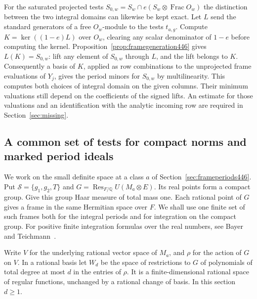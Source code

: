 \documentclass[a4paper,11pt]{article}
\theoremstyle{definition}
\theoremstyle{remark}
\numberwithin{equation}{section}
\begin{document}
For the saturated projected tests \(S_{0,w}=S_w\cap e(S_w\otimes
\operatorname{Frac}O_w)\) the distinction between the two integral
domains can likewise be kept exact. Let \(L\) send the standard
generators of a free \(O_w\)-module to the tests \(t_{a,g}\).
Compute \(K=\ker((1-e)L)\) over \(O_w\), clearing any scalar
denominator of \(1-e\) before computing the kernel.
Proposition~\ref{prop:framegeneration446} gives \(L(K)=S_{0,w}\):
lift any element of \(S_{0,w}\) through \(L\), and the lift
belongs to \(K\). Consequently a basis of \(K\), applied as row
combinations to the unprojected frame evaluations of \(Y_j\),
gives the period minors for \(S_{0,w}\) by multilinearity.
This computes both choices of integral domain on the given columns.
Their minimum valuations still depend on the coefficients of the
signed lifts. An estimate for those valuations and an identification
with the analytic incoming row are required in Section~\ref{sec:missing}.


\subsection{A common set of tests for compact norms and marked period ideals}
\label{sec:compactquadrature447}

We work on the small definite space at a class \(a\) of
Section~\ref{sec:frameperiods446}. Put \(\mathcal S=\{g_1,g_2,T\}\)
and \(G=\operatorname{Res}_{F/\mathbb Q}U(M_a\otimes E)\). Its real
points form a compact group. Give this group Haar measure of total
mass one. Each rational point of \(G\) gives a frame in the same
Hermitian space over \(F\). We shall use one finite set of such
frames both for the integral periods and for integration on the
compact group. For positive finite integration formulas over the
real numbers, see Bayer and Teichmann~\cite{XXVI-XX-bayer447}.

Write \(V\) for the underlying rational vector space of \(M_a\),
and \(\rho\) for the action of \(G\) on \(V\). In a rational basis
let \(W_d\) be the space of restrictions to \(G\) of polynomials
of total degree at most \(d\) in the entries of \(\rho\). It is a
finite-dimensional rational space of regular functions, unchanged
by a rational change of basis. In this section \(d\ge1\).
\end{document}
